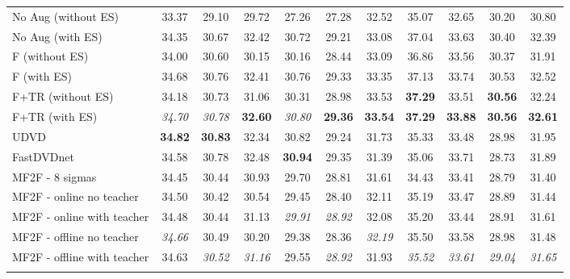 \documentclass[final]{cvpr}
\begin{document}
\begin{table*}[t]
{\begin{tabular}{lcccccccccc}
        No Aug  \hfill(without ES)  & 33.37 & 29.10 & 29.72 & 27.26 & 27.28 & 32.52 & 35.07 & 32.65 & 30.20 & 30.80 \\
        No Aug \hfill(with ES) & 34.35 & 30.67 & 32.42 & 30.72 & 29.21 & 33.08 & 37.04 & 33.63 & 30.40 & 32.39 \\
        F  \hfill(without ES)       & 34.00 & 30.60 & 30.15 & 30.16 & 28.44 & 33.09 & 36.86 & 33.56 & 30.37 & 31.91 \\
        F   \hfill(with ES) & 34.68 & 30.76 & 32.41 & 30.76 & 29.33 & 33.35 & 37.13 & 33.74 & 30.53 & 32.52 \\
        F+TR  \hfill(without ES)    & 34.18 & 30.73 & 31.06 & 30.31 & 28.98 & 33.53 & \textbf{37.29} & 33.51 & \textbf{30.56} & 32.24 \\
        F+TR    \hfill(with ES)   & \textit{34.70} & \textit{30.78} & \textbf{32.60} & \textit{30.80} & \textbf{29.36} & \textbf{33.54} & \textbf{37.29} & \textbf{33.88} & \textbf{30.56} & \textbf{32.61} \\
        \midrule
        UDVD         & \textbf{34.82} & \textbf{30.83} & 32.34 & 30.82 & 29.24 & 31.73 & 35.33 & 33.48 & 28.98 & 31.95 \\
        FastDVDnet   & 34.58 & 30.78 & 32.48 & \textbf{30.94} & 29.35 & 31.39 & 35.06 & 33.71 & 28.73 & 31.89 \\
        \midrule
        MF2F - 8 sigmas               & 34.45 & 30.44 & 30.93 & 29.70 & 28.81 & 31.61 & 34.43 & 33.41 & 28.79 & 31.40 \\
        MF2F - online no teacher      & 34.50 & 30.42 & 30.54 & 29.45 & 28.40 & 32.11 & 35.19 & 33.47 & 28.89 & 31.44 \\
        MF2F - online with teacher    & 34.48 & 30.44 & 31.13 & \textit{29.91} & \textit{28.92} & 32.08 & 35.20 & 33.44 & 28.91 & 31.61 \\
        MF2F - offline no teacher     & \textit{34.66} & 30.49 & 30.20 & 29.38 & 28.36 & \textit{32.19} & 35.50 & 33.58 & 28.98 & 31.48 \\
        MF2F - offline with teacher   & 34.63 & \textit{30.52} & \textit{31.16} & 29.55 & \textit{28.92} & 31.93 & \textit{35.52} & \textit{33.61} & \textit{29.04} & \textit{31.65} \\
        \bottomrule \\
    \end{tabular}
    }

\end{table*}
\end{document}
